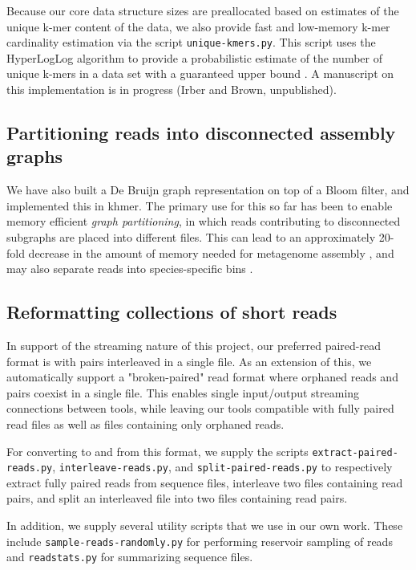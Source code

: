 \documentclass[10pt,a4paper]{article}
\begin{document}
Because our core data structure sizes are preallocated based on estimates of the unique k-mer content of the data, we also provide fast and low-memory k-mer cardinality estimation via the script {\tt unique-kmers.py}.  This script uses the HyperLogLog algorithm to provide a probabilistic estimate of the number of unique k-mers in a data set with a guaranteed upper bound \cite{flajolet2008hyperloglog}. A manuscript on this implementation is in progress (Irber and Brown, unpublished).

\subsection*{Partitioning reads into disconnected assembly graphs}

We have also built a De Bruijn graph representation on top of a Bloom
filter, and implemented this in khmer.  The primary use for this so
far has been to enable memory efficient {\em graph partitioning}, in
which reads contributing to disconnected subgraphs are placed into
different files.  This can lead to an approximately 20-fold decrease
in the amount of memory needed for metagenome assembly
\cite{Pell2012}, and may also separate reads into species-specific
bins \cite{Howe2014}.


\subsection*{Reformatting collections of short reads}

In support of the streaming nature of this project, our preferred paired-read format is
with pairs interleaved in a single file. As an extension of this, we automatically support a "broken-paired"
read format where orphaned reads and pairs coexist in a single file. This enables single input/output streaming
connections between tools, while leaving our tools compatible with fully paired read files as well as files containing only orphaned reads.

For converting to and from this format, we supply the scripts {\tt extract-paired-reads.py},
{\tt interleave-reads.py}, and {\tt split-paired-reads.py} to respectively extract fully paired
reads from sequence files, interleave two files containing read pairs, and split an interleaved
file into two files containing read pairs.

In addition, we supply several utility scripts that we use in our own work.  These include
{\tt sample-reads-randomly.py} for performing reservoir sampling of reads and {\tt readstats.py}
for summarizing sequence files.
\end{document}
